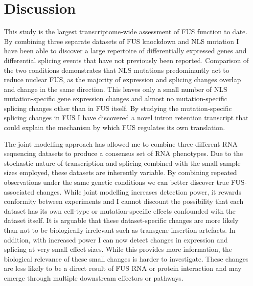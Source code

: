 
\section{Discussion}

This study is the largest transcriptome-wide assessment of FUS function to date.
By combining three separate datasets of FUS knockdown and NLS mutation I have been able to discover a large repertoire of differentially expressed genes and differential splicing events that have not previously been reported.
Comparison of the two conditions demonstrates that NLS mutations predominantly act to reduce nuclear FUS, as the majority of expression and splicing changes overlap and change in the same direction.
This leaves only a small number of NLS mutation-specific gene expression changes and almost no mutation-specific splicing changes other than in FUS itself. 
By studying the mutation-specific splicing changes in FUS I have discovered a novel intron retention transcript that could explain the mechanism by which FUS regulates its own translation.

The joint modelling approach has allowed me to combine three different RNA sequencing datasets to produce a consensus set of RNA phenotypes.
Due to the stochastic nature of transcription and splicing combined with the small sample sizes employed, these datasets are inherently variable.
By combining repeated observations  under the same genetic conditions we can better discover true FUS-associated changes.
While joint modelling increases detection power, it rewards conformity between experiments and I cannot discount the possibility that each dataset has its own cell-type or mutation-specific effects confounded with the dataset itself.
It is arguable that these dataset-specific changes are more likely than not to be biologically irrelevant such as transgene insertion artefacts. 
In addition, with increased power I can now detect changes in expression and splicing at very small effect sizes. 
While this provides more information, the biological relevance of these small changes is harder to investigate.
These changes are less likely to be a direct result of FUS RNA or protein interaction and may emerge through multiple downstream effectors or pathways.

